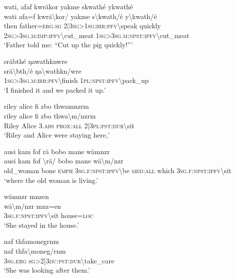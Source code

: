 \ea\label{ex:12:a781}
wati, afaf kwräkor yakme skwathé ykwathé\\
\gll wati	afa=f	kwrä{\textbackslash}kor/	yakme	s{\textbackslash}kwath/é	y{\textbackslash}kwath/é\\
     then	father=\textsc{erg}.\textsc{sg}	2|3\textsc{sg}>1\textsc{sg}:\textsc{irr}:\textsc{pfv}{\textbackslash}speak	quickly	2\textsc{sg}>3\textsc{sg}.\textsc{m}:\textsc{imp}:\textsc{ipfv}{\textbackslash}cut\_meat	1\textsc{sg}>3\textsc{sg}.\textsc{m}:\textsc{npst}:\textsc{ipfv}{\textbackslash}cut\_meat\\
\glt `Father told me: ``Cut up the pig quickly!'''
\z

\ea\label{ex:12:a782}
sräbthé ŋawathknwre\\
\gll srä{\textbackslash}bth/é	ŋa{\textbackslash}wathkn/wre\\
     1\textsc{sg}>3\textsc{sg}.\textsc{m}:\textsc{irr}:\textsc{pfv}{\textbackslash}finish	1\textsc{pl}:\textsc{npst}:\textsc{ipfv}{\textbackslash}pack\_up\\
\glt `I finished it and we packed it up.'
\z

\ea\label{ex:12:a784}
riley alice fi zbo thwamnzrm\\
\gll riley	alice	fi	zbo	thwa{\textbackslash}m/nzrm\\
     Riley	Alice	3.\textsc{abs}	\textsc{prox}:\textsc{all}	2|3\textsc{pl}:\textsc{pst}:\textsc{dur}{\textbackslash}sit\\
\glt `Riley and Alice were staying here,'
\z

\ea\label{ex:12:a787}
ausi kam fof rä bobo mane wämnzr\\
\gll ausi	kam	fof	{\textbackslash}rä/	bobo	mane	wä{\textbackslash}m/nzr\\
     old\_woman	bone	\textsc{emph}	3\textsc{sg}.\textsc{f}:\textsc{npst}:\textsc{ipfv}{\textbackslash}be	\textsc{med}:\textsc{all}	which	3\textsc{sg}.\textsc{f}:\textsc{npst}:\textsc{ipfv}{\textbackslash}sit\\
\glt `where the old woman is living.'
\z

\ea\label{ex:12:a788}
wämnzr mnzen\\
\gll wä{\textbackslash}m/nzr	mnz=en\\
     3\textsc{sg}.\textsc{f}:\textsc{npst}:\textsc{ipfv}{\textbackslash}sit	house=\textsc{loc}\\
\glt `She stayed in the house.'
\z

\ea\label{ex:12:a789}
naf thfamonegrnm\\
\gll naf	thfa{\textbackslash}moneg/rnm\\
     3\textsc{sg}.\textsc{erg}	\textsc{sg}>2|3\textsc{du}:\textsc{pst}:\textsc{dur}{\textbackslash}take\_care\\
\glt `She was looking after them.'
\z

